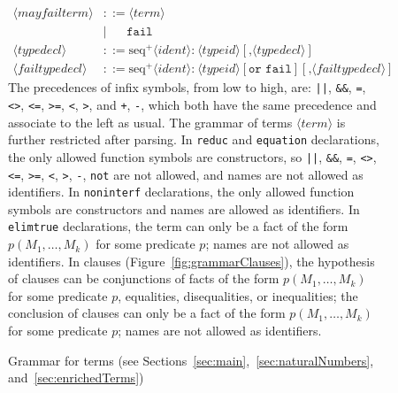 \documentclass{book}
\newcommand{\nonterm}[1]{\langle\mathit{#1}\rangle}
\newcommand{\neseq}[1]{\textrm{seq}^+\nonterm{#1}}
\begin{document}
\begin{figure}
\begin{align*}
%
\nonterm{mayfailterm} &::= \nonterm{term}\\
&\mid\phantom{:=}\texttt{fail}\\
%
\nonterm{typedecl} &::= \neseq{ident}\texttt{:}\ \nonterm{typeid}[\texttt{,}\nonterm{typedecl}]\\
%
\nonterm{failtypedecl}  &::= \neseq{ident}\texttt{:}\ \nonterm{typeid} [\texttt{or fail}] [\texttt{,} \nonterm{failtypedecl}]
\end{align*}
%
The precedences of infix symbols, from low to high, are:
\texttt{||}, \texttt{\&\&}, \texttt{=}, \texttt{<>}, \texttt{<=}, \texttt{>=}, \texttt{<}, \texttt{>}, and \texttt{+}, \texttt{-}, which both have the same precedence and associate to the left as usual.
The grammar of terms $\nonterm{term}$ is further restricted after parsing.
%
In {\tt reduc} and {\tt equation} declarations, the only allowed function symbols are constructors,
so \texttt{||}, \texttt{\&\&}, \texttt{=}, \texttt{<>}, \texttt{<=}, \texttt{>=}, \texttt{<}, \texttt{>}, \texttt{-}, \texttt{not} are not
allowed, and names are not allowed as identifiers.
%
In {\tt noninterf} declarations, the only allowed function symbols are constructors
and names are allowed as identifiers.
%
In {\tt elimtrue} declarations, the term can only be a fact of the form
$p(M_1, \ldots, M_k)$ for some predicate $p$; names are not allowed as identifiers.
%
In clauses (Figure~\ref{fig:grammarClauses}), the hypothesis of clauses can be conjunctions
of facts of the form $p(M_1, \ldots, M_k)$ for some predicate $p$, equalities, disequalities,
or inequalities; the conclusion of clauses can only be a fact of the form
$p(M_1, \ldots, M_k)$ for some predicate $p$; names are not allowed as identifiers.

\medskip

\caption[Grammar for terms]{Grammar for terms (see Sections~\ref{sec:main},~\ref{sec:naturalNumbers}, and~\ref{sec:enrichedTerms})}
\label{fig:grammarTerms}
\end{figure}


\end{document}
